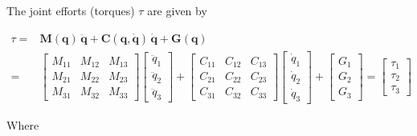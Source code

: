 The joint efforts (torques) $\tau$ are given by

\begin{align}
    \tau =& \mathbf{M(q) \, \ddot{q} + C(q, \dot{q}) \, \dot{q} + G(q)} \\
    =& \begin{bmatrix}
        M_{11} & M_{12} & M_{13} \\
        M_{21} & M_{22} & M_{23} \\
        M_{31} & M_{32} & M_{33}
        \end{bmatrix} \begin{bmatrix}
            \ddot{q}_1 \\ \ddot{q}_2 \\ \ddot{q}_3
            \end{bmatrix}
    + \begin{bmatrix}
        C_{11} & C_{12} & C_{13} \\
        C_{21} & C_{22} & C_{23} \\
        C_{31} & C_{32} & C_{33}
        \end{bmatrix} \begin{bmatrix}
            \dot{q}_1 \\ \dot{q}_2 \\ \dot{q}_3
            \end{bmatrix}
    + \begin{bmatrix}
        G_1 \\ G_2 \\ G_3
        \end{bmatrix}
    = \begin{bmatrix}
        \tau_1 \\ \tau_2 \\ \tau_3
        \end{bmatrix}
    \label{eq:3r-dyn-tau-vect}
\end{align}

Where


